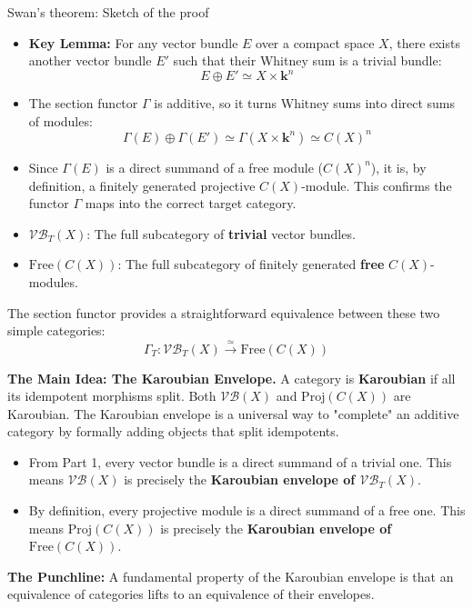 \documentclass[10pt]{beamer}
\begin{document}
\begin{frame}[allowframebreaks]{Swan's theorem: Sketch of the proof}
	\begin{itemize}
		\item \textbf{Key Lemma:} For any vector bundle $E$ over a compact space $X$, there exists another vector bundle $E'$ such that their Whitney sum is a trivial bundle:
		\[ E \oplus E' \simeq X \times \mathbf{k}^n \]
		\item The section functor $\Gamma$ is additive, so it turns Whitney sums into direct sums of modules:
		\[ \Gamma(E) \oplus \Gamma(E') \simeq \Gamma(X \times \mathbf{k}^n) \simeq C(X)^n \]
		\item Since $\Gamma(E)$ is a direct summand of a free module ($C(X)^n$), it is, by definition, a finitely generated projective $C(X)$-module. This confirms the functor $\Gamma$ maps into the correct target category.
	\end{itemize}
	\pagebreak
	\begin{itemize}
		\item $\mathcal{VB}_T(X)$: The full subcategory of \textbf{trivial} vector bundles.
		\item $\mathrm{Free}(C(X))$: The full subcategory of finitely generated \textbf{free} $C(X)$-modules.
	\end{itemize}
	The section functor provides a straightforward equivalence between these two simple categories:
	\[ \Gamma_T: \mathcal{VB}_T(X) \stackrel{\simeq}{\longrightarrow} \mathrm{Free}(C(X)) \]
	
	\pagebreak
	
	\textbf{The Main Idea: The Karoubian Envelope.}
	A category is \textbf{Karoubian} if all its idempotent morphisms split. Both $\mathcal{VB}(X)$ and $\mathrm{Proj}(C(X))$ are Karoubian. The Karoubian envelope is a universal way to "complete" an additive category by formally adding objects that split idempotents.
	
	\begin{itemize}
		\item From Part 1, every vector bundle is a direct summand of a trivial one. This means $\mathcal{VB}(X)$ is precisely the \textbf{Karoubian envelope of $\mathcal{VB}_T(X)$}.
		
		\item By definition, every projective module is a direct summand of a free one. This means $\mathrm{Proj}(C(X))$ is precisely the \textbf{Karoubian envelope of $\mathrm{Free}(C(X))$}.
	\end{itemize}
	
	\textbf{The Punchline:} A fundamental property of the Karoubian envelope is that an equivalence of categories lifts to an equivalence of their envelopes.
\end{frame}
\end{document}
